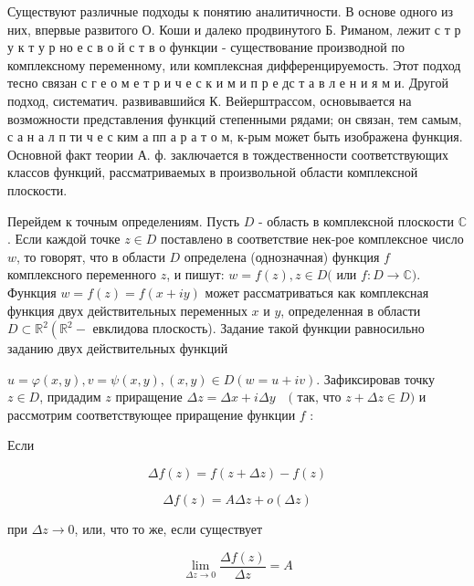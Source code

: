 \documentclass[10pt]{article}
\begin{document}
Существуют различные подходы к понятию аналитичности. В основе одного из них, впервые развитого О. Коши и далеко продвинутого Б. Риманом, лежит с т р у к т у р но е с в о й с т в о функции - существование производной по комплексному переменному, или комплексная дифференцируемость. Этот подход тесно связан с г е о м е т р и ч е с к и м и п р е дс т а в л е н и я м и. Другой подход, систематич. развивавшийся $К$. Вейерштрассом, основывается на возможности представления функций степенными рядами; он связан, тем самым, с а н а л п ти ч е с ким а пп а р а т о м, к-рым может быть изображена функция. Основной факт теории А. ф. заключается в тождественности соответствующих классов функций, рассматриваемых в произвольной области комплексной плоскости.



Перейдем к точным определениям. Пусть $D$ - область в комплексной плоскости $\mathbb{C}$. Если каждой точке $z \in D$ поставлено в соответствие нек-рое комплексное число $w$, то говорят, что в области $D$ определена (однозначная) функция $f$ комплексного переменного $z$, и пишут: $w=f(z), z \in D($ или $f: D \rightarrow \mathbb{C})$. Функция $w=f(z)=f(x+i y)$ может рассматриваться как комплексная функция двух действительных переменных $x$ и $y$, определенная в области $D \subset \mathbb{R}^{2}\left(\mathbb{R}^{2}-\right.$ евклидова плоскость). Задание такой функции равносильно заданию двух действительных функций



$u=\varphi(x, y), v=\psi(x, y),(x, y) \in D(w=u+i v)$. Зафиксировав точку $z \in D$, придадим $z$ приращение $\Delta z=\Delta x+i \Delta y \quad($ так, что $z+\Delta z \in D)$ и рассмотрим соответствующее приращение функции $f$ :



Если



\[

\Delta f(z)=f(z+\Delta z)-f(z)

\]



\[

\Delta f(z)=A \Delta z+o(\Delta z)

\]



при $\Delta z \rightarrow 0$, или, что то же, если существует



\[

\lim _{\Delta z \rightarrow 0} \frac{\Delta f(z)}{\Delta z}=A

\]
\end{document}
